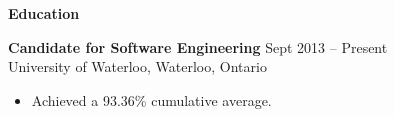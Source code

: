 \documentclass{letter}
\begin{document}
{\bfseries \Large Education}

\vspace{-1.5mm}
{\bfseries Candidate for Software Engineering} \hfill Sept 2013 -- Present \\
University of Waterloo, Waterloo, Ontario
\vspace{-3mm}
\begin{itemize}
    \item Achieved a 93.36\% cumulative average.
\end{itemize}
\end{document}
